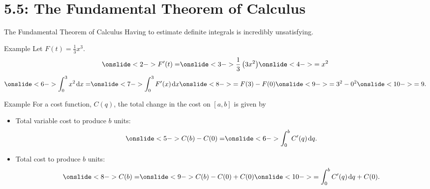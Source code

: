 \documentclass[Lecture.tex]{subfiles}
\begin{document}
\section{5.5: The Fundamental Theorem of Calculus}

\begin{frame}{The Fundamental Theorem of Calculus}
  Having to estimate definite integrals is incredibly unsatisfying.
\end{frame}

\begin{frame}{Example}
  Let $F(t) = \frac{1}{3}x^3$.
  $$\onslide<2->{F^\prime(t) =} \onslide<3->{\frac{1}{3}\left(3x^2\right)} \onslide<4->{= x^2}$$
  $$\onslide<6->{\int_0^3 x^2\dx{x} =} \onslide<7->{\int_0^3 F^\prime(x)\dx{x}} \onslide<8->{= F(3) - F(0)} \onslide<9->{= 3^2 - 0^2} \onslide<10->{= 9.}$$
  
\end{frame}

\begin{frame}{Example}
  For a cost function, $C(q)$, the total change in the cost on $[a,b]$ is given by

  \begin{itemize}
  \item<4->
    Total variable cost to produce $b$ units:
    $$\onslide<5->{C(b) - C(0) = } \onslide<6->{\int_0^b C^\prime(q)\dx{q}.}$$
  \item<7->
    Total cost to produce $b$ units:
    $$\onslide<8->{C(b) = } \onslide<9->{C(b) - C(0) + C(0)} \onslide<10->{= \int_0^b C^\prime(q)\dx{q} + C(0)}.$$
  \end{itemize}
\end{frame}
\end{document}
